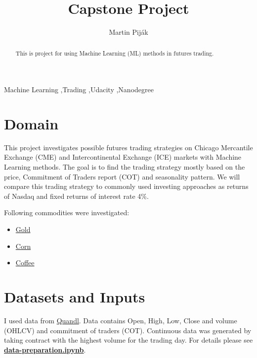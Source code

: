 \documentclass[final,2p]{elsarticle}
\begin{document}
\begin{frontmatter}

\title{Capstone Project}

\author{Martin Pij{\'a}k}

\address{Bratislava, Slovakia}

\begin{abstract}
This is project for using Machine Learning (ML) methods in futures trading.
\end{abstract}

\begin{keyword}
Machine Learning \sep{Trading} \sep{Udacity} \sep{Nanodegree}

\end{keyword}

\end{frontmatter}


\section{Domain}

This project investigates possible futures trading strategies on Chicago Mercantile Exchange (CME) and Intercontinental Exchange (ICE) markets with Machine Learning methods. The goal is to find the trading strategy mostly based on the price, Commitment of Traders report (COT) and seasonality pattern. We will compare this trading strategy to commonly used investing approaches as returns of Nasdaq and fixed returns of interest rate 4\%.

Following commodities were investigated:
\begin{itemize}
    \item \href{https://www.cmegroup.com/trading/metals/precious/gold.html}{Gold}
    \item \href{https://www.cmegroup.com/trading/agricultural/grain-and-oilseed/corn.html}{Corn}
    \item \href{https://www.cmegroup.com/trading/agricultural/softs/coffee.html}{Coffee}
\end{itemize}
\clearpage
\section{Datasets and Inputs}

I used data from \href{https://www.quandl.com/}{Quandl}. Data contains Open, High, Low, Close and volume (OHLCV) and commitment of traders (COT).
Continuous data was generated by taking contract with the highest volume for the trading day. For details please see \href{https://github.com/IzidoroBaltazar/MachineLearningEngineer/blob/master/capstone\_project/data-preparation.ipynb}{\textbf{data-preparation.ipynb}}.
\end{document}
